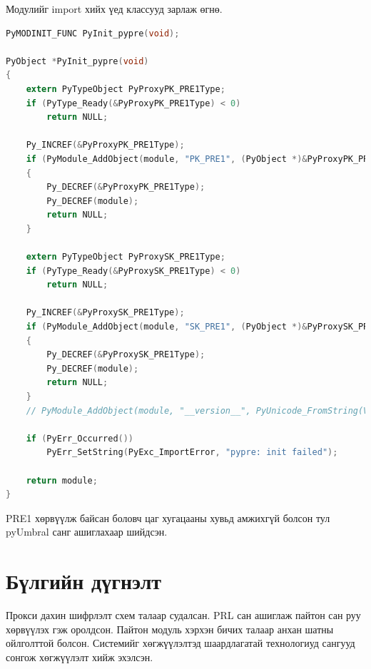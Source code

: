\noindent Модулийг import хийх үед классууд зарлаж өгнө.

\begin{lstlisting}[language=C, caption={Модуль нь init хийхэд зарлах классууд}, captionpos=b]
PyMODINIT_FUNC PyInit_pypre(void);

PyObject *PyInit_pypre(void)
{
    extern PyTypeObject PyProxyPK_PRE1Type;
    if (PyType_Ready(&PyProxyPK_PRE1Type) < 0)
        return NULL;

    Py_INCREF(&PyProxyPK_PRE1Type);
    if (PyModule_AddObject(module, "PK_PRE1", (PyObject *)&PyProxyPK_PRE1Type) < 0)
    {
        Py_DECREF(&PyProxyPK_PRE1Type);
        Py_DECREF(module);
        return NULL;
    }

    extern PyTypeObject PyProxySK_PRE1Type;
    if (PyType_Ready(&PyProxySK_PRE1Type) < 0)
        return NULL;

    Py_INCREF(&PyProxySK_PRE1Type);
    if (PyModule_AddObject(module, "SK_PRE1", (PyObject *)&PyProxySK_PRE1Type) < 0)
    {
        Py_DECREF(&PyProxySK_PRE1Type);
        Py_DECREF(module);
        return NULL;
    }
    // PyModule_AddObject(module, "__version__", PyUnicode_FromString(VERSION));

    if (PyErr_Occurred())
        PyErr_SetString(PyExc_ImportError, "pypre: init failed");

    return module;
}
\end{lstlisting}

\noindent PRE1 хөрвүүлж байсан боловч цаг хугацааны хувьд амжихгүй болсон тул pyUmbral санг ашиглахаар шийдсэн.

\section{Бүлгийн дүгнэлт}
Прокси дахин шифрлэлт схем талаар судалсан. PRL сан ашиглаж пайтон сан руу хөрвүүлэх гэж оролдсон. Пайтон модуль хэрхэн бичих талаар анхан шатны ойлголттой болсон.
Системийг хөгжүүлэлтэд шаардлагатай технологиуд сангууд сонгож хөгжүүлэлт хийж эхэлсэн.